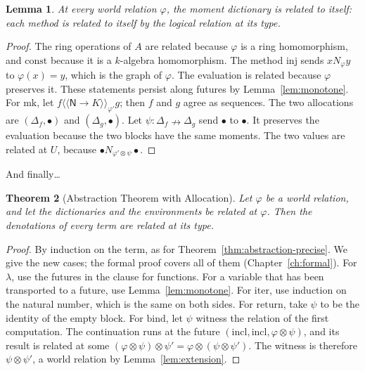 \documentclass[11pt,a4paper]{report}
\theoremstyle{plain}
\newtheorem{theorem}{Theorem}[chapter]
\newtheorem{lemma}[theorem]{Lemma}
\theoremstyle{definition}
\theoremstyle{remark}
\newcommand{\Nat}{\mathsf{N}}
\newcommand{\mk}{\mathrm{mk}}
\newcommand{\rel}[2]{\langle\!\langle #1 \rangle\!\rangle_{#2}}
\begin{document}
\begin{lemma}
\label{lem:dictrel}
At every world relation $\varphi$, the moment dictionary is related to itself:
each method is related to itself by the logical relation at its type.
\end{lemma}

\begin{proof}
The ring operations of $A$ are related because $\varphi$ is a ring homomorphism,
and $\mathrm{const}$ because it is a $k$-algebra homomorphism. The method
$\mathrm{inj}$ sends $x \mathrel{N_\varphi} y$ to $\varphi(x) = y$, which is the
graph of $\varphi$. The evaluation is related because $\varphi$ preserves it.
These statements persist along futures by Lemma~\ref{lem:monotone}. For $\mk$,
let $f \mathrel{\rel{\Nat \to K}{\varphi'}} g$; then $f$ and $g$ agree as
sequences. The two allocations are $(\Delta_f, \bullet)$ and
$(\Delta_g, \bullet)$. Let $\psi : \Delta_f \nrightarrow \Delta_g$ send $\bullet$
to $\bullet$. It preserves the evaluation because the two blocks have the same
moments. The two values are related at $U$, because
$\bullet \mathrel{N_{\varphi' \otimes \psi}} \bullet$.
\end{proof}

And finally\ldots

\begin{theorem}[Abstraction Theorem with Allocation]
\label{thm:abstraction2}
Let $\varphi$ be a world relation, and let the dictionaries and the environments
be related at $\varphi$. Then the denotations of every term are related at its
type.
\end{theorem}

\begin{proof}
By induction on the term, as for Theorem~\ref{thm:abstraction-precise}. We give
the new cases; the formal proof covers all of them (Chapter~\ref{ch:formal}). For
$\lambda$, use the futures in the clause for functions. For a variable that has
been transported to a future, use Lemma~\ref{lem:monotone}. For
$\mathrm{iter}$, use induction on the natural number, which is the same on both
sides. For $\mathrm{return}$, take $\psi$ to be the identity of the empty block.
For $\mathrm{bind}$, let $\psi$ witness the relation of the first computation.
The continuation runs at the future
$(\mathrm{incl}, \mathrm{incl}, \varphi \otimes \psi)$, and its result is related
at some $(\varphi \otimes \psi) \otimes \psi' = \varphi \otimes (\psi \otimes \psi')$.
The witness is therefore $\psi \otimes \psi'$, a world relation by
Lemma~\ref{lem:extension}.
\end{proof}
\end{document}
